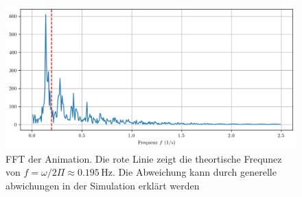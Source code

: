 \begin{figure}
    \centering
    \includegraphics[width=\linewidth]{papers/reaktdiff/images/LotkaVolterra/fft_plot_latex.png}
    \caption{FFT der Animation. Die rote Linie zeigt die theortische Frequnez von \(f = \omega / 2 \Pi \approx 0.195\,\text{Hz}\). Die Abweichung kann durch generelle abwichungen in der Simulation erklärt werden}
    \label{reaktdiff:fig:lvfft}
\end{figure}





